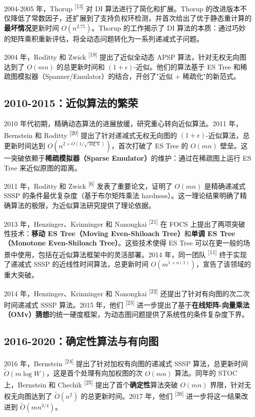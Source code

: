 \documentclass[12pt,a4paper]{ctexart}
\begin{document}
2004-2005 年，Thorup \textsuperscript{[13]}  对 DI 算法进行了简化和扩展。Thorup 的改进版本不仅降低了常数因子，还扩展到了支持负权环检测，并首次给出了优于静态重计算的\textbf{最坏情况}更新时间 $O(n^{2.75})$。Thorup 的工作揭示了 DI 算法的本质：通过巧妙的矩阵乘积重新评估，将全动态问题转化为一系列递减式子问题。

2004 年，Roditty 和 Zwick \textsuperscript{[19]}  提出了近似全动态 APSP 算法，针对无权无向图达到了 $O(mn)$ 的总更新时间和 $(1+\epsilon)$-近似。他们的算法基于 ES Tree 和稀疏图模拟器（Spanner/Emulator）的结合，开创了"近似 + 稀疏化"的新范式。

\subsection{2010-2015：近似算法的繁荣}

2010 年代初期，精确动态算法的进展放缓，研究重心转向近似算法。2011 年，Bernstein 和 Roditty \textsuperscript{[20]}  提出了针对递减式无权无向图的 $(1+\epsilon)$-近似算法，总更新时间达到 $O(n^{2+O(1/\sqrt{\log n})})$，首次打破了 ES Tree 的 $O(mn)$ 壁垒。这一突破依赖于\textbf{稀疏模拟器（Sparse Emulator）}的维护：通过在稀疏图上运行 ES Tree 来近似原图的距离。

2011 年，Roditty 和 Zwick \textsuperscript{[6]}  发表了重要论文，证明了 $O(mn)$ 是精确递减式 SSSP 的条件最优复杂度（基于布尔矩阵乘法 hardness）。这一理论结果明确了精确算法的极限，为近似算法研究提供了理论依据。

2013 年，Henzinger、Krinninger 和 Nanongkai \textsuperscript{[21]}  在 FOCS 上提出了两项突破性技术：\textbf{移动 ES Tree（Moving Even-Shiloach Tree）}和\textbf{单调 ES Tree（Monotone Even-Shiloach Tree）}。这些技术使得 ES Tree 可以在更一般的场景中使用，包括在近似算法框架中的灵活部署。2014 年，同一团队 \textsuperscript{[11]}  终于实现了递减式 SSSP 的近线性时间算法，总更新时间 $O(m^{1+o(1)})$，宣告了该领域的重大突破。

2014 年，Henzinger、Krinninger 和 Nanongkai \textsuperscript{[22]}  还提出了针对有向图的次二次时间递减式 SSSP 算法。2015 年，他们 \textsuperscript{[23]}  进一步提出了基于\textbf{在线矩阵-向量乘法（OMv）猜想}的统一硬度框架，为动态图问题提供了系统性的条件复杂度下界。

\subsection{2016-2020：确定性算法与有向图}

2016 年，Bernstein \textsuperscript{[24]}  提出了针对加权有向图的递减式 SSSP 算法，总更新时间 $\tilde{O}(m\log W)$，这是首个处理有向加权图的次 $O(mn)$ 算法。同年的 STOC 上，Bernstein 和 Chechik \textsuperscript{[25]}  提出了首个\textbf{确定性}算法突破 $O(mn)$ 界限，针对无权无向图达到了 $\tilde{O}(n^2)$ 的总更新时间。2017 年，他们 \textsuperscript{[26]}  进一步将这一结果改进到 $\tilde{O}(mn^{3/4})$。
\end{document}
